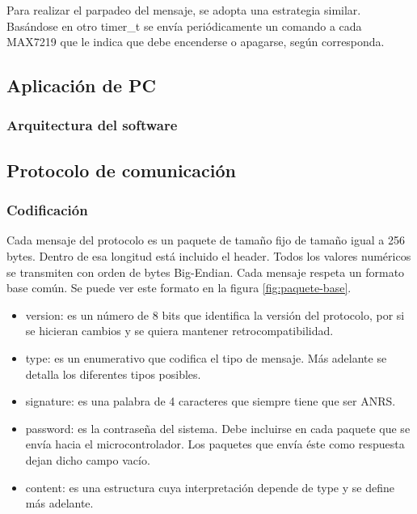 Para realizar el parpadeo del mensaje, se adopta una estrategia similar.
Basándose en otro timer\_t se envía periódicamente un comando a cada MAX7219 que le indica que debe encenderse o apagarse, según corresponda.


\subsection{Aplicación de PC}
\subsubsection{Arquitectura del software}



\subsection{Protocolo de comunicación} \label{sec:protocolo}

\subsubsection{Codificación}

Cada mensaje del protocolo es un paquete de tamaño fijo de tamaño igual a 256 bytes.
Dentro de esa longitud está incluido el header.
Todos los valores numéricos se transmiten con orden de bytes Big-Endian.
Cada mensaje respeta un formato base común. Se puede ver este formato en la figura \ref{fig:paquete-base}.


\begin{itemize}
	\item version: es un número de 8 bits que identifica la versión del protocolo, por si se hicieran cambios y se quiera mantener retrocompatibilidad.
	\item type: es un enumerativo que codifica el tipo de mensaje. Más adelante se detalla los diferentes tipos posibles.
	\item signature: es una palabra de 4 caracteres que siempre tiene que ser ANRS.
	\item password: es la contraseña del sistema. Debe incluirse en cada paquete que se envía hacia el microcontrolador. Los paquetes que envía éste como respuesta dejan dicho campo vacío.
	\item content: es una estructura cuya interpretación depende de type y se define más adelante.
\end{itemize}




